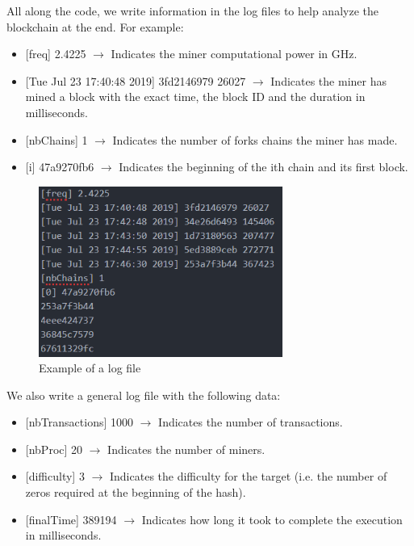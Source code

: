 All along the code, we write information in the log files to help analyze the blockchain at the end. For example: \newline

\begin{itemize}
  \item {[freq]} 2.4225  $\rightarrow$ Indicates the miner computational power in GHz.
  \item {[Tue Jul 23 17:40:48 2019]} 3fd2146979 26027 $\rightarrow$ Indicates the miner has mined a block with the exact time, the block ID and the duration in milliseconds.
  \item {[nbChains]} 1 $\rightarrow$ Indicates the number of forks chains the miner has made.
  \item {[i]} 47a9270fb6 $\rightarrow$ Indicates the beginning of the ith chain and its first block.
\end{itemize}
\medskip

\begin{figure}[ht]
\centering
\includegraphics[width=8cm]{Figures/logExample}
\caption{Example of a log file}
\end{figure}
\medskip

We also write a general log file with the following data: \newline

\begin{itemize}
  \item {[nbTransactions]} 1000 $\rightarrow$ Indicates the number of transactions.
  \item {[nbProc]} 20 $\rightarrow$ Indicates the number of miners.
  \item {[difficulty]} 3 $\rightarrow$ Indicates the difficulty for the target (i.e. the number of zeros required at the beginning of the hash).
  \item {[finalTime]} 389194 $\rightarrow$ Indicates how long it took to complete the execution in milliseconds.
\end{itemize}



